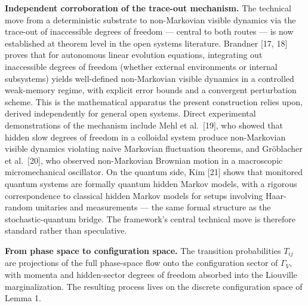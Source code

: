 \documentclass[
]{article}
\begin{document}
\textbf{Independent corroboration of the trace-out mechanism.} The
technical move from a deterministic substrate to non-Markovian visible
dynamics via the trace-out of inaccessible degrees of freedom ---
central to both routes --- is now established at theorem level in the
open systems literature. Brandner {[}17, 18{]} proves that for
autonomous linear evolution equations, integrating out inaccessible
degrees of freedom (whether external environments or internal
subsystems) yields well-defined non-Markovian visible dynamics in a
controlled weak-memory regime, with explicit error bounds and a
convergent perturbation scheme. This is the mathematical apparatus the
present construction relies upon, derived independently for general open
systems. Direct experimental demonstrations of the mechanism include
Mehl et al.~{[}19{]}, who showed that hidden slow degrees of freedom in
a colloidal system produce non-Markovian visible dynamics violating
naive Markovian fluctuation theorems, and Gröblacher et al.~{[}20{]},
who observed non-Markovian Brownian motion in a macroscopic
micromechanical oscillator. On the quantum side, Kim {[}21{]} shows that
monitored quantum systems are formally quantum hidden Markov models,
with a rigorous correspondence to classical hidden Markov models for
setups involving Haar-random unitaries and measurements --- the same
formal structure as the stochastic-quantum bridge. The framework's
central technical move is therefore standard rather than speculative.

\textbf{From phase space to configuration space.} The transition
probabilities \(T_{ij}\) are projections of the full phase-space flow
onto the configuration sector of \(\Gamma_V\), with momenta and
hidden-sector degrees of freedom absorbed into the Liouville
marginalization. The resulting process lives on the discrete
configuration space of Lemma 1.
\end{document}

